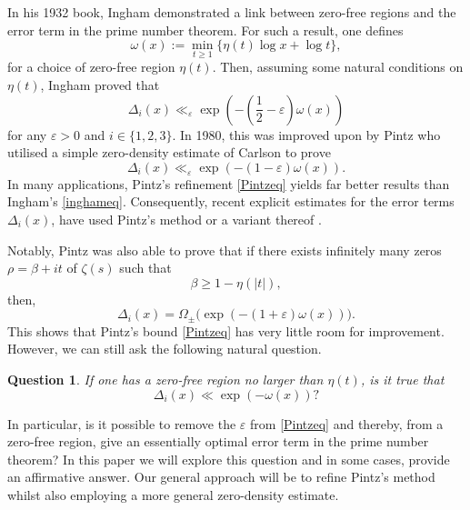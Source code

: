 \documentclass[reqno]{amsart}
\newtheorem{question}[theorem]{Question}
\numberwithin{equation}{section}
\theoremstyle{remark}
\begin{document}
In his 1932 book, Ingham \cite{ingham1932distribution} demonstrated a link between zero-free regions and the error term in the prime number theorem. For such a result, one defines
\begin{equation}
    \omega(x):=\min_{t\geq 1}\{\eta(t)\log x+\log t\},
\end{equation}
for a choice of zero-free region $\eta(t)$. Then, assuming some natural conditions on $\eta(t)$, Ingham proved that \cite[Theorem 22]{ingham1932distribution}
\begin{equation}\label{inghameq}
    \Delta_i(x)\ll_{\varepsilon} \exp\left(-\left(\frac{1}{2}-\varepsilon\right)\omega(x)\right)
\end{equation}
for any $\varepsilon>0$ and $i\in\{1,2,3\}$. In 1980, this was improved upon by Pintz \cite[Theorem 1]{pintz1980remainder} who utilised a simple zero-density estimate of Carlson \cite{carlson1920nullstellen} to prove
\begin{equation}\label{Pintzeq}
    \Delta_i(x)\ll_{\varepsilon} \exp(-(1-\varepsilon)\omega(x)).
\end{equation}
In many applications, Pintz's refinement \eqref{Pintzeq} yields far better results than Ingham's \eqref{inghameq}. Consequently, recent explicit estimates for the error terms $\Delta_i(x)$, have used Pintz's method or a variant thereof \cite{platt2021error,broadbent2021sharper,johnston2023some,fiori2023sharpera,fiori2023sharperb}. 

Notably, Pintz was also able to prove \cite[Theorem 2]{pintz1980remainder} that if there exists infinitely many zeros $\rho=\beta+it$ of $\zeta(s)$ such that 
\begin{equation*}
    \beta\geq 1-\eta(|t|),
\end{equation*}
then,
\begin{equation*}
    \Delta_i(x)=\Omega_{\pm}\bigg(\exp(-(1+\varepsilon)\omega(x))\bigg).
\end{equation*}
This shows that Pintz's bound \eqref{Pintzeq} has very little room for improvement. However, we can still ask the following natural question.
\begin{question}\label{mainquest}
    If one has a zero-free region no larger than $\eta(t)$, is it true that
    \begin{equation*}
        \Delta_i(x)\ll\exp(-\omega(x))?
    \end{equation*}
\end{question}
In particular, is it possible to remove the $\varepsilon$ from \eqref{Pintzeq} and thereby, from a zero-free region, give an essentially optimal error term in the prime number theorem? In this paper we will explore this question and in some cases, provide an affirmative answer. Our general approach will be to refine Pintz's method whilst also employing a more general zero-density estimate.
\end{document}
